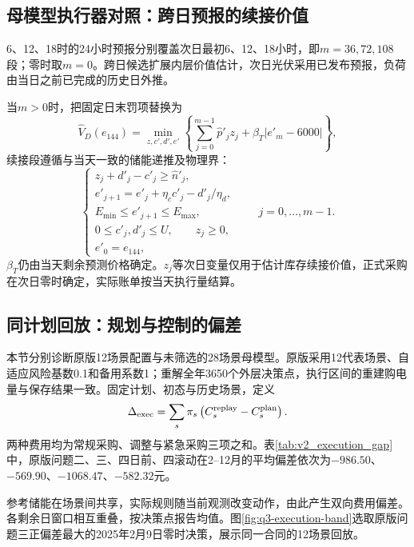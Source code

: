 \subsection{母模型执行器对照：跨日预报的续接价值}

6、12、18时的24小时预报分别覆盖次日最初6、12、18小时，即$m=36,72,108$段；零时取$m=0$。跨日候选扩展内层价值估计，次日光伏采用已发布预报，负荷由当日之前已完成的历史日外推。

当$m>0$时，把固定日末罚项替换为
\begin{equation}
 \widehat V_D(e_{144})=\min_{z,c',d',e'}
 \left\{\sum_{j=0}^{m-1}\widehat p'_jz_j+\beta_T|e'_m-6000|\right\},
 \label{eq:v2_continuation}
\end{equation}
续接段遵循与当天一致的储能递推及物理界：
\[
 \begin{cases}
 z_j+d'_j-c'_j\ge\widehat n'_j,\\
 e'_{j+1}=e'_j+\eta_cc'_j-d'_j/\eta_d,\\
 E_{\min}\le e'_{j+1}\le E_{\max},\\
 0\le c'_j,d'_j\le U,\qquad z_j\ge0,\\
 e'_0=e_{144},
 \end{cases}
 \qquad j=0,\ldots,m-1.
\]
$\beta_T$仍由当天剩余预测价格确定。$z_j$等次日变量仅用于估计库存续接价值，正式采购在次日零时确定，实际账单按当天执行量结算。

\subsection{同计划回放：规划与控制的偏差}

本节分别诊断原版12场景配置与未筛选的28场景母模型。原版采用12代表场景、自适应风险基数0.1和备用系数1；重解全年3650个外层决策点，执行区间的重建购电量与保存结果一致。固定计划、初态与历史场景，定义
\begin{equation}
 \Delta_{\rm exec}=\sum_s\pi_s\left(C_s^{\rm replay}-C_s^{\rm plan}\right).
 \label{eq:v2_execution_gap}
\end{equation}
两种费用均为常规采购、调整与紧急采购三项之和。表\ref{tab:v2_execution_gap}中，原版问题二、三、四日前、四滚动在2--12月的平均偏差依次为$-986.50$、$-569.90$、$-1068.47$、$-582.32$元。



参考储能在场景间共享，实际规则随当前观测改变动作，由此产生双向费用偏差。各剩余日窗口相互重叠，按决策点报告均值。图\ref{fig:q3-execution-band}选取原版问题三正偏差最大的2025年2月9日零时决策，展示同一合同的12场景回放。

